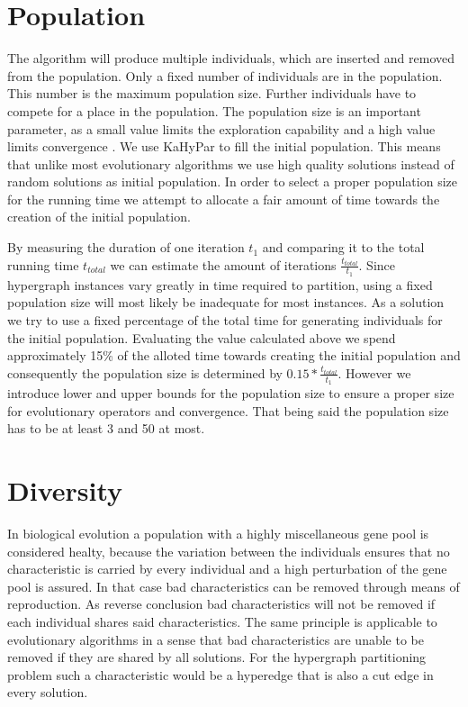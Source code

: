 \documentclass[a4paper,12pt,titlepage, BCOR7mm,headsepline]{scrbook}
\numberwithin{equation}{section}
\begin{document}
\section{Population}
\label{sec:population}
The algorithm will produce multiple individuals, which are inserted and removed from the population. Only a fixed number of
individuals are in the population. This number is the maximum population size. Further individuals have to compete for a place in the population. 
The population size is an important parameter, as a small value limits the exploration capability and a high value limits convergence \cite{chen2012large}.
We use KaHyPar to fill the initial population. This means that unlike most evolutionary algorithms we use high quality solutions instead of random solutions as initial population.
In order to select a proper population size for the running time we attempt to allocate a fair amount of time towards the creation of the initial population. 

By measuring the duration of one iteration $t_1$ and comparing it to the total running time ${t_{total}}$ we can estimate the amount of iterations $\frac{t_{total}}{t_1}$. Since hypergraph instances
vary greatly in time required to partition, using a fixed population size will most likely be inadequate for most instances. As a solution we try to use a fixed percentage of the total time for generating 
individuals for the initial population. Evaluating the value calculated above we spend approximately 15\% of the alloted time towards creating the initial population and consequently the population size is determined by $0.15*\frac{t_{total}}{t_1}$.
However we introduce lower and upper bounds for the population size to ensure a proper size for evolutionary operators and convergence. That being said the population size has to be at least 3 and 50 at most.
\section{Diversity}
\label{sec:diversity}
In biological evolution a population with a highly miscellaneous gene pool is considered healty, because the variation between the individuals ensures that no characteristic is carried by every individual and a high perturbation of the gene pool is assured. In that case bad characteristics can be removed through means of reproduction. As reverse conclusion bad characteristics will not be removed if each individual shares said characteristics. 
The same principle is applicable to evolutionary algorithms in a sense that bad characteristics are unable to be removed if they are shared by all solutions. For the hypergraph partitioning problem such a characteristic would be a hyperedge that is also a cut edge in every solution. 
\end{document}
